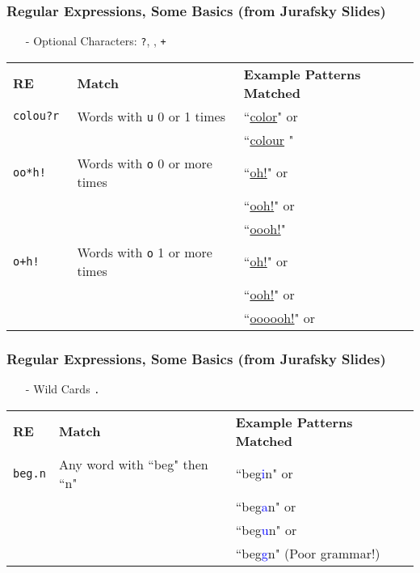 \documentclass{beamer}
\numberwithin{equation}{section}
\begin{document}
\begin{frame}
\frametitle{Regular Expressions, Some Basics (from Jurafsky Slides) }
\begin{itemize}
\item[-] Optional Characters: {\tt ?}, {\tt *}, {\tt +}
\end{itemize}
\begin{center}
\begin{tabular}{lll}
\textbf{RE} & \textbf{Match} & \textbf{Example Patterns Matched}\\
{\tt colou?r } &  Words with {\tt u}  0 or 1 times& ``\underline{color}"  or \\
                   &                                & ``\underline{colour} " \\
{\tt oo*h!}     & Words with {\tt o}  0 or more times & ``\underline{oh!}" or \\
                      &                                                   &   ``\underline{ooh!}" or \\
                       &                                                   &   ``\underline{oooh!}" \\
{\tt o+h!} &   Words with {\tt o} 1 or more times & ``\underline{oh!}" or \\
  &                                                   &   ``\underline{ooh!}" or \\
    &                                                   &   ``\underline{oooooh!}" or \\
\end{tabular}
\end{center}
\end{frame}

\begin{frame}
\frametitle{Regular Expressions, Some Basics (from Jurafsky Slides) }
\begin{itemize}
\item[-] Wild Cards \alert{{\tt .} }
\end{itemize}
\begin{center}
\begin{tabular}{lll}
\textbf{RE} & \textbf{Match} & \textbf{Example Patterns Matched}\\
{\tt beg\alert{.}n} & Any word with ``beg" then ``n" & ``beg\textcolor{blue}{i}n" or \\
                          &                                            &  ``beg\textcolor{blue}{a}n" or \\
                          &                                            &  ``beg\textcolor{blue}{u}n" or \\
                          &                                            &  ``beg\textcolor{blue}{g}n" (Poor grammar!)

 \end{tabular}
 \end{center}

 \end{frame}
\end{document}
